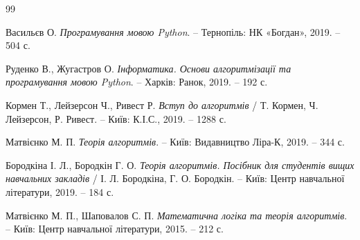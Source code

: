 \begin{thebibliography}{99}
	
	Васильєв О. \textit{Програмування мовою Python}. – Тернопіль: НК «Богдан», 2019. – 504 с.
	
	Руденко В., Жугастров О. \textit{Інформатика. Основи алгоритмізації та програмування мовою Python}. – Харків: Ранок, 2019. – 192 с.
	
	Кормен Т., Лейзерсон Ч., Ривест Р. \textit{Вступ до алгоритмів} / Т. Кормен, Ч. Лейзерсон, Р. Ривест. – Київ: К.І.С., 2019. – 1288 с.
	
	Матвієнко М. П. \textit{Теорія алгоритмів}. – Київ: Видавництво Ліра-К, 2019. – 344 с.
	
	Бородкіна І. Л., Бородкін Г. О. \textit{Теорія алгоритмів. Посібник для студентів вищих навчальних закладів} / І. Л. Бородкіна, Г. О. Бородкін. – Київ: Центр навчальної літератури, 2019. – 184 с.
	
	Матвієнко М. П., Шаповалов С. П. \textit{Математична логіка та теорія алгоритмів}. – Київ: Центр навчальної літератури, 2015. – 212 с.
	
\end{thebibliography}
